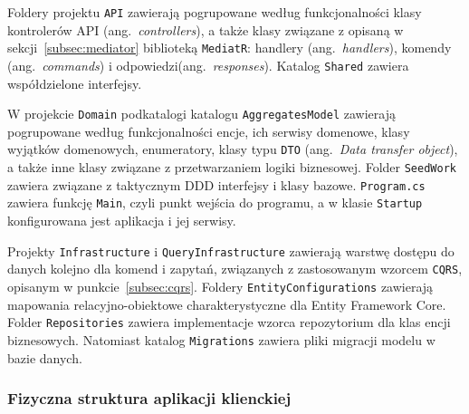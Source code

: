 Foldery projektu \texttt{API} zawierają pogrupowane według funkcjonalności klasy kontrolerów API (ang.~\emph{controllers}), a także klasy związane z opisaną w sekcji~\ref{subsec:mediator} biblioteką \texttt{MediatR}: handlery (ang.~\emph{handlers}), komendy (ang.~\emph{commands}) i odpowiedzi(ang.~\emph{responses}). Katalog \texttt{Shared} zawiera współdzielone interfejsy. 

W projekcie \texttt{Domain} podkatalogi katalogu \texttt{AggregatesModel} zawierają pogrupowane według funkcjonalności encje, ich serwisy domenowe, klasy wyjątków domenowych, enumeratory, klasy typu \texttt{DTO} (ang.~\emph{Data transfer object}), a także inne klasy związane z przetwarzaniem logiki biznesowej. Folder \texttt{SeedWork} zawiera związane z taktycznym DDD interfejsy i klasy bazowe. \texttt{Program.cs} zawiera funkcję \texttt{Main}, czyli punkt wejścia do programu, a w klasie \texttt{Startup} konfigurowana jest aplikacja i jej serwisy.

Projekty \texttt{Infrastructure} i \texttt{QueryInfrastructure} zawierają warstwę dostępu do danych kolejno dla komend i zapytań, związanych z zastosowanym wzorcem \texttt{CQRS}, opisanym w punkcie~\ref{subsec:cqrs}. Foldery \texttt{EntityConfigurations} zawierają mapowania relacyjno-obiektowe charakterystyczne dla Entity Framework Core. Folder \texttt{Repositories} zawiera implementacje wzorca repozytorium dla klas encji biznesowych. Natomiast katalog \texttt{Migrations} zawiera pliki migracji modelu w bazie danych.


\subsubsection{Fizyczna struktura aplikacji klienckiej}

